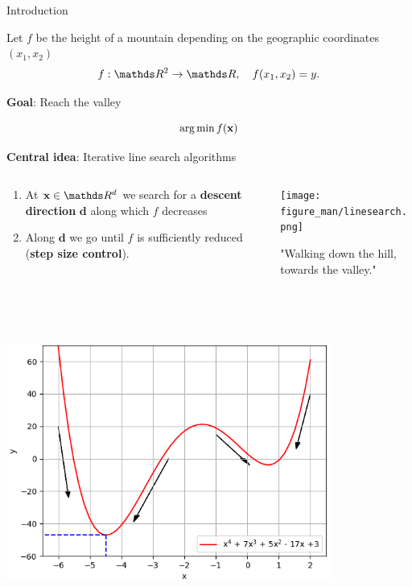 \begin{vbframe}{Introduction}

	Let $f$ be the height of a mountain depending on the geographic coordinates $(x_1, x_2)$
	\vspace*{-0.1cm}
	$$
	f: \R^2 \to \R, \quad f(x_1, x_2) = y.
	$$
	
	\textbf{Goal}: Reach the valley

	$$
	\operatorname{arg\,min} f(\mathbf{x})
	$$
	
	\textbf{Central idea}: Iterative line search algorithms
	\vspace*{-0.15cm}
	\begin{columns}
		\begin{column}{0.58\textwidth}
			\begin{enumerate}
				\item At $\xv \in \R^d$ we search for a \textbf{descent direction} $\mathbf{d}$ along which $f$ decreases
			  	\item Along $\mathbf{d}$ we go until $f$ is sufficiently reduced (\textbf{step size control}).
			\end{enumerate}
		\end{column}
		\begin{column}{0.4\textwidth}
			\begin{center}
			\texttt{[image: figure\_man/linesearch.png]}
			\hspace{2cm} \begin{footnotesize} "Walking down the hill, towards the valley." \end{footnotesize}\\
			\end{center}
		\end{column}
	\end{columns}
	
\framebreak

\begin{center}
$ $ \\
\includegraphics[width=0.8\textwidth]{figure_man/negative_gradients.png}
\end{center}

\end{vbframe}

